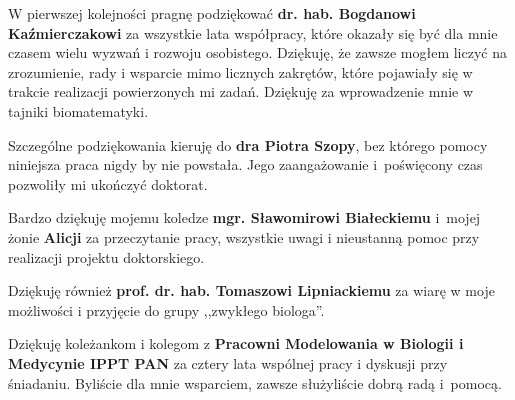\thispagestyle{empty}

{\large \noindent  W pierwszej kolejności pragnę podziękować \textbf{dr. hab. Bogdanowi Kaźmierczakowi} za wszystkie lata 
współpracy, które okazały się być dla mnie czasem wielu wyzwań i rozwoju osobistego. Dziękuję, że zawsze mogłem liczyć na zrozumienie, rady i wsparcie mimo licznych zakrętów, które pojawiały się w trakcie realizacji powierzonych mi zadań. Dziękuję za wprowadzenie mnie w tajniki biomatematyki.

\vspace{1cm}

\noindent Szczególne podziękowania kieruję do \textbf{dra Piotra Szopy}, bez którego pomocy niniejsza praca nigdy by nie powstała. Jego zaangażowanie i~poświęcony czas  pozwoliły mi ukończyć doktorat.

\vspace{1cm}

\noindent Bardzo dziękuję mojemu koledze \textbf{ mgr. Sławomirowi Białeckiemu} i~mojej żonie \textbf{Alicji} za przeczytanie pracy, wszystkie uwagi i nieustanną pomoc przy realizacji projektu doktorskiego.

\vspace{1cm}

\noindent Dziękuję również \textbf{prof. dr. hab. Tomaszowi Lipniackiemu} za wiarę w moje możliwości i przyjęcie do grupy ,,zwykłego biologa''.

\vspace{1cm}

\noindent Dziękuję koleżankom i kolegom z \textbf{Pracowni Modelowania w Biologii i Medycynie IPPT PAN} za cztery lata wspólnej pracy i dyskusji przy śniadaniu. Byliście dla mnie wsparciem, zawsze służyliście dobrą radą i~pomocą.}